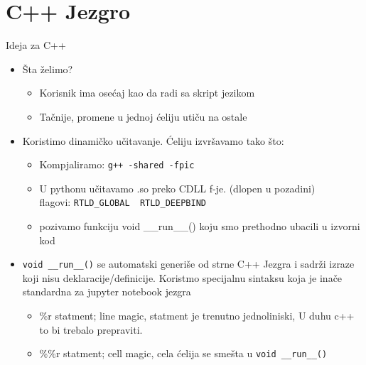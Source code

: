 \documentclass{beamer}
\begin{document}
\section {C++ Jezgro}

\begin{frame}[fragile]{Ideja za C++}
  \begin{itemize}

    \item{ Šta želimo?
        \begin{itemize}
          \item{Korisnik ima osećaj kao da radi sa skript jezikom}
          \item{Tačnije, promene u jednoj ćeliju utiču na ostale }
        \end{itemize}
        \pause
      }

    \item{ Koristimo dinamičko učitavanje. Ćeliju izvršavamo
        tako što: \pause
        \begin{itemize}
          \item{Kompjaliramo: \verb|g++ -shared -fpic| \pause}
          \item{U pythonu učitavamo .so preko CDLL f-je.
            (dlopen u pozadini) \\
            flagovi: \verb|RTLD_GLOBAL  RTLD_DEEPBIND|

          \pause}
          \item {pozivamo funkciju void \_\_run\_\_() koju smo prethodno
            ubacili u izvorni kod \pause}
        \end{itemize}
      }

    \item{  \verb|void __run__()|  se automatski generiše
        od strne C++ Jezgra i sadrži izraze koji nisu
        deklaracije/definicije. Koristmo specijalnu sintaksu koja
        je inače standardna za jupyter notebook jezgra  \pause
        \begin{itemize}
          \item{ \%r statment; line magic, statment je trenutno
            jednoliniski, U duhu c++ to bi trebalo prepraviti.}
          \item{ \%\%r statment;  cell magic, cela ćelija se
            smešta u \verb|void __run__()|}
        \end{itemize}
      }


  \end{itemize}


\end{frame}
\end{document}
